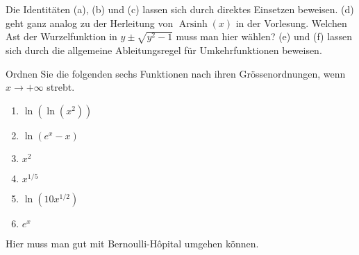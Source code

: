 \documentclass[12pt]{article}
\DeclareMathOperator{\arcsinh}{Arsinh}
\newenvironment{problem}[2][\textcolor{blue}{Tipps \& Tricks zu}]{\begin{trivlist}
        \item[\hskip \labelsep {\bfseries #1}\hskip \labelsep {\bfseries \textcolor{blue}{#2}.}]}{\end{trivlist}}
\newenvironment{question}[2][\textcolor{red}{Aufgabe}]{\begin{trivlist}
        \item[\hskip \labelsep {\bfseries \textcolor{red}{#1}}\hskip \labelsep {\bfseries \textcolor{red}{#2}.}]}{\end{trivlist}}
\begin{document}
\begin{problem}{3} Die Identitäten (a), (b) und (c) lassen sich durch direktes Einsetzen beweisen. (d) geht ganz analog zu der Herleitung von $\arcsinh(x)$ in der Vorlesung. Welchen Ast der Wurzelfunktion in $y\pm\sqrt{y^2-1}$ muss man hier wählen? (e) und (f) lassen sich durch die allgemeine Ableitungsregel für Umkehrfunktionen beweisen.
\end{problem}

\begin{question}{4}
        Ordnen Sie die folgenden sechs Funktionen nach ihren Grössenordnungen, wenn $x\to +\infty$ strebt.
        \begin{enumerate}[label=(\alph*)]
                \item $\ln\left(\ln(x^2)\right)$
                \item $\ln\left(e^x-x\right)$
                \item $x^2$
                \item $x^{1/5}$
                \item $\ln\left(10x^{1/2}\right)$
                \item $e^x$
        \end{enumerate}
\end{question}

\begin{problem}{4} Hier muss man gut mit Bernoulli-Hôpital umgehen können.
\end{problem}
\end{document}
